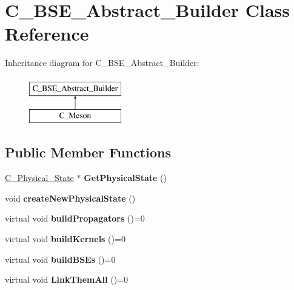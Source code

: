 \hypertarget{class_c___b_s_e___abstract___builder}{\section{C\-\_\-\-B\-S\-E\-\_\-\-Abstract\-\_\-\-Builder Class Reference}
\label{class_c___b_s_e___abstract___builder}
}
Inheritance diagram for C\-\_\-\-B\-S\-E\-\_\-\-Abstract\-\_\-\-Builder\-:\begin{figure}[H]
\begin{center}
\leavevmode
\includegraphics[height=2.000000cm]{class_c___b_s_e___abstract___builder}
\end{center}
\end{figure}
\subsection*{Public Member Functions}
\begin{DoxyCompactItemize}
\item 
\hypertarget{class_c___b_s_e___abstract___builder_a3f7822420d57f9ab4d858462b2b0c025}{\hyperlink{class_c___physical___state}{C\-\_\-\-Physical\-\_\-\-State} $\ast$ {\bfseries Get\-Physical\-State} ()}\label{class_c___b_s_e___abstract___builder_a3f7822420d57f9ab4d858462b2b0c025}

\item 
\hypertarget{class_c___b_s_e___abstract___builder_aaff489dcaf76185835f8cbdc813d587f}{void {\bfseries create\-New\-Physical\-State} ()}\label{class_c___b_s_e___abstract___builder_aaff489dcaf76185835f8cbdc813d587f}

\item 
\hypertarget{class_c___b_s_e___abstract___builder_a313d2a39237b8382af4135c39fe5c333}{virtual void {\bfseries build\-Propagators} ()=0}\label{class_c___b_s_e___abstract___builder_a313d2a39237b8382af4135c39fe5c333}

\item 
\hypertarget{class_c___b_s_e___abstract___builder_a2badc8ce81676b7b4b11f4e1b2abe5b8}{virtual void {\bfseries build\-Kernels} ()=0}\label{class_c___b_s_e___abstract___builder_a2badc8ce81676b7b4b11f4e1b2abe5b8}

\item 
\hypertarget{class_c___b_s_e___abstract___builder_a07dfdd24a8fea467d063a751fc6cae4f}{virtual void {\bfseries build\-B\-S\-Es} ()=0}\label{class_c___b_s_e___abstract___builder_a07dfdd24a8fea467d063a751fc6cae4f}

\item 
\hypertarget{class_c___b_s_e___abstract___builder_a61f6cb37d934ce2b9d68fcb905df63b0}{virtual void {\bfseries Link\-Them\-All} ()=0}\label{class_c___b_s_e___abstract___builder_a61f6cb37d934ce2b9d68fcb905df63b0}

\end{DoxyCompactItemize}
